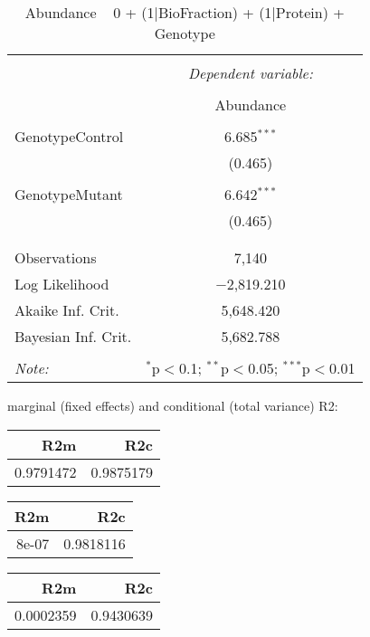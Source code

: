 \documentclass[11pt]{report}
\begin{document}
\begin{table}[!htbp] \centering 
  \caption{Abundance ~ 0 + (1|BioFraction) + (1|Protein) + Genotype} 
  \label{} 
\begin{tabular}{@{\extracolsep{5pt}}lc} 
\\[-1.8ex]\hline 
\hline \\[-1.8ex] 
 & \multicolumn{1}{c}{\textit{Dependent variable:}} \\ 
\cline{2-2} 
\\[-1.8ex] & Abundance \\ 
\hline \\[-1.8ex] 
 GenotypeControl & 6.685$^{***}$ \\ 
  & (0.465) \\ 
  & \\ 
 GenotypeMutant & 6.642$^{***}$ \\ 
  & (0.465) \\ 
  & \\ 
\hline \\[-1.8ex] 
Observations & 7,140 \\ 
Log Likelihood & $-$2,819.210 \\ 
Akaike Inf. Crit. & 5,648.420 \\ 
Bayesian Inf. Crit. & 5,682.788 \\ 
\hline 
\hline \\[-1.8ex] 
\textit{Note:}  & \multicolumn{1}{r}{$^{*}$p$<$0.1; $^{**}$p$<$0.05; $^{***}$p$<$0.01} \\ 
\end{tabular} 
\end{table} 
marginal (fixed effects) and conditional (total variance) R2:

\begin{tabular}{r|r}
\hline
R2m & R2c\\
\hline
0.9791472 & 0.9875179\\
\hline
\end{tabular}

\begin{tabular}{r|r}
\hline
R2m & R2c\\
\hline
8e-07 & 0.9818116\\
\hline
\end{tabular}

\begin{tabular}{r|r}
\hline
R2m & R2c\\
\hline
0.0002359 & 0.9430639\\
\hline
\end{tabular}
\end{document}
